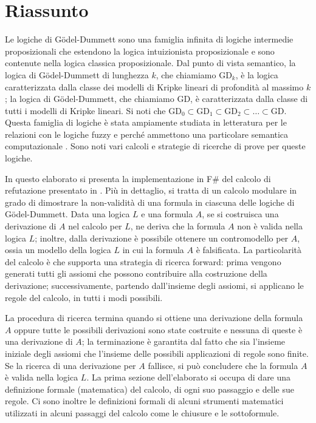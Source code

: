 \documentclass{oist}
\begin{document}
\section*{Riassunto}

Le logiche di G\"odel-Dummett sono una famiglia infinita di logiche
intermedie proposizionali che estendono la logica intuizionista
proposizionale
e sono contenute nella logica classica proposizionale.
Dal punto di vista semantico, la logica di  G\"odel-Dummett di lunghezza
$k$,
che chiamiamo $\mathrm{GD}_k$,
\`e la logica caratterizzata dalla classe dei  modelli di Kripke lineari
di profondit\`a
al massimo $k$; la logica di  G\"odel-Dummett,  che chiamiamo $\mathrm{GD}$,
\`e caratterizzata dalla classe di tutti i  modelli di  Kripke lineari.
Si noti che $\mathrm{GD}_0\subset\mathrm{GD}_1
    \subset\mathrm{GD}_2\subset\dots\subset \mathrm{GD}$.
Questa famiglia di logiche \`e stata ampiamente studiata in letteratura
per le relazioni con le logiche
fuzzy \cite{Hajek:98} e perch\'e ammettono una particolare semantica computazionale
\cite{AscCiaGen:2017,Avron:91b}.
Sono noti vari calcoli e strategie di ricerche di prove per queste logiche.

In questo elaborato si presenta la implementazione in F\# del calcolo di
refutazione
presentato in \cite{cilc:2022}.
Pi\`u in dettaglio,
si tratta di un calcolo modulare in grado di dimostrare
la non-validit\`a di una formula in ciascuna delle logiche di
G\"odel-Dummett.
Data una logica $L$ e una formula $A$, se si costruisca una derivazione
di $A$ nel calcolo per $L$,
ne deriva che la formula $A$ non \`e valida nella logica $L$;
inoltre, dalla derivazione \`e possibile ottenere un contromodello per
$A$, ossia un modello
della logica $L$ in cui la formula $A$ \`e falsificata.
La particolarit\`a del calcolo \`e che supporta una strategia di ricerca
forward: prima vengono
generati tutti gli assiomi che possono contribuire alla costruzione
della derivazione;
successivamente, partendo dall'insieme degli assiomi, si applicano le
regole del calcolo, in tutti i modi possibili.

La procedura di ricerca termina quando si ottiene una derivazione  della
formula $A$ oppure tutte le possibili derivazioni  sono state costruite
e nessuna di queste \`e una derivazione di $A$; la terminazione \`e
garantita
dal fatto che sia  l'insieme iniziale degli assiomi che l'insieme delle
possibili applicazioni di regole sono finite.
Se la ricerca di una derivazione per $A$ fallisce,
si pu\`o concludere che la formula $A$ \`e valida nella logica $L$.
La prima sezione dell'elaborato si occupa di dare una definizione formale (matematica) del calcolo, di ogni suo passaggio e delle sue regole. Ci sono inoltre le definizioni formali di alcuni strumenti matematici utilizzati in alcuni passaggi del calcolo come le chiusure e le sottoformule.
\end{document}
